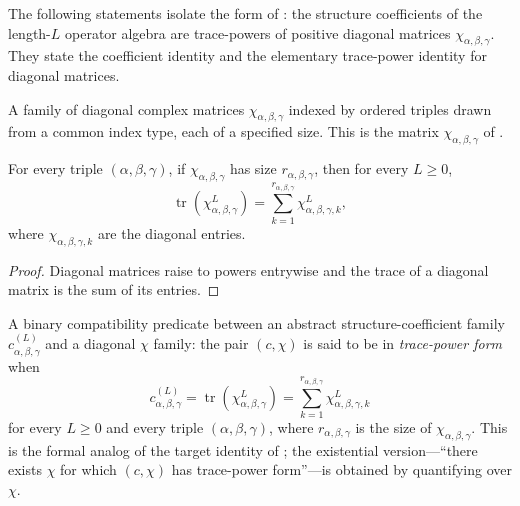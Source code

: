The following statements isolate the form of
\cite[Theorem~4.14(ii)]{Cirac2016MPDO_arXiv}: the structure coefficients
of the length-$L$ operator algebra are trace-powers of positive diagonal
matrices $\chi_{\alpha,\beta,\gamma}$. They state the coefficient identity and
the elementary trace-power identity for diagonal matrices.

\begin{definition}%
    \label{def:mpdo_diagonal_chi_family}
    \leanok
    A family of diagonal complex matrices $\chi_{\alpha,\beta,\gamma}$ indexed
    by ordered triples drawn from a common index type, each of a specified
    size. This is the matrix $\chi_{\alpha,\beta,\gamma}$ of
    \cite[Theorem~4.14(ii)]{Cirac2016MPDO_arXiv}.
\end{definition}

\begin{theorem}%
    \label{thm:mpdo_trace_matrix_pow}
    \leanok
    For every triple $(\alpha, \beta, \gamma)$, if $\chi_{\alpha,\beta,\gamma}$
    has size $r_{\alpha,\beta,\gamma}$, then for every $L \ge 0$,
    \[
        \operatorname{tr}(\chi_{\alpha,\beta,\gamma}^{L})
        = \sum_{k=1}^{r_{\alpha,\beta,\gamma}}
        \chi_{\alpha,\beta,\gamma,k}^{L},
    \]
    where $\chi_{\alpha,\beta,\gamma,k}$ are the diagonal entries.
\end{theorem}
\begin{proof}\leanok
    Diagonal matrices raise to powers entrywise and the trace of a diagonal matrix
    is the sum of its entries.
\end{proof}

\begin{definition}%
    \label{def:mpdo_has_chi_trace_power_form}
    \leanok
    A binary compatibility predicate between an abstract structure-coefficient
    family $c^{(L)}_{\alpha,\beta,\gamma}$ and a diagonal $\chi$ family: the
    pair $(c, \chi)$ is said to be in \emph{trace-power form} when
    \[
        c^{(L)}_{\alpha,\beta,\gamma}
        = \operatorname{tr}(\chi_{\alpha,\beta,\gamma}^{L})
        = \sum_{k=1}^{r_{\alpha,\beta,\gamma}}
        \chi_{\alpha,\beta,\gamma,k}^{L}
    \]
    for every $L \ge 0$ and every triple $(\alpha, \beta, \gamma)$, where
    $r_{\alpha,\beta,\gamma}$ is the size of $\chi_{\alpha,\beta,\gamma}$. This
    is the formal analog of the target identity of
    \cite[Theorem~4.14(ii)]{Cirac2016MPDO_arXiv}; the existential
    version---``there exists $\chi$ for which $(c,\chi)$ has trace-power
    form''---is obtained by quantifying over $\chi$.
\end{definition}

